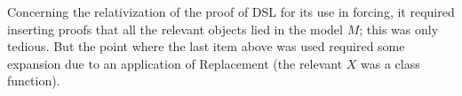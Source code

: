 Concerning the relativization of the proof of DSL for its use in
forcing, it required inserting proofs that all the relevant objects
lied in the model $M$; this was only tedious. But the point where the
last item above was used required some expansion due to an application
of Replacement (the relevant $X$ was a class function).



